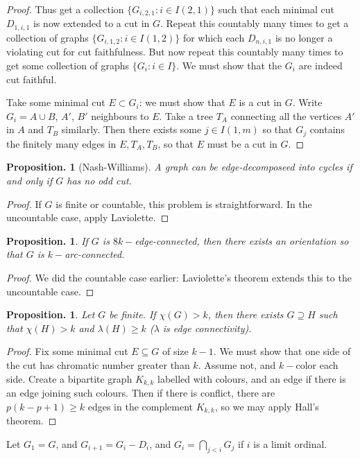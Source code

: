 \documentclass[11pt, a4paper]{memoir}
\theoremstyle{change}
\newtheorem{proposition}[theorem]{Proposition.}
\theoremstyle{plain}
\theoremstyle{nonumberplain}
\newtheorem{proof}{Proof}
\numberwithin{equation}{section}
\begin{document}
\begin{proof}
    Thus get a collection $\{G_{i,2,1}:i\in I(2,1)\}$ such that each minimal cut $D_{1,i,1}$ is now extended to a cut in $G$.
    Repeat this countably many times to get a collection of graphs $\{G_{i,1,2}:i\in I(1,2)\}$ for which each $D_{n,i,1}$ is no longer a violating cut for cut faithfulness.
    But now repeat this countably many times to get some collection of graphs $\{G_i:i\in I\}$.
    We must show that the $G_i$ are indeed cut faithful.

    Take some minimal cut $E\subset G_i$: we must show that $E$ is a cut in $G$.
    Write $G_i=A\cup B$, $A'$, $B'$ neighbours to $E$.
    Take a tree $T_A$ connecting all the vertices $A'$ in $A$ and $T_B$ similarly.
    Then there exists some $j\in I(1,m)$ so that $G_j$ contains the finitely many edges in $E,T_A,T_B$, so that $E$ must be a cut in $G$.
\end{proof}
\begin{proposition}[Nash-Williams]
    A graph can be edge-decomposeed into cycles if and only if $G$ has no odd cut.
\end{proposition}
\begin{proof}
    If $G$ is finite or countable, this problem is straightforward.
    In the uncountable case, apply Laviolette.
\end{proof}
\begin{proposition}
    If $G$ is $8k-$edge-connected, then there exists an orientation so that $G$ is $k-$arc-connected.
\end{proposition}
\begin{proof}
    We did the countable case earlier: Laviolette's theorem extends this to the uncountable case.
\end{proof}
\begin{proposition}
    Let $G$ be finite.
    If $\chi(G)>k$, then there exists $G\supseteq H$ such that $\chi(H)>k$ and $\lambda(H)\geq k$ ($\lambda$ is edge connectivity).
\end{proposition}
\begin{proof}
    Fix some minimal cut $E\subseteq G$ of size $k-1$.
    We must show that one side of the cut has chromatic number greater than $k$.
    Assume not, and $k-$color each side.
    Create a bipartite graph $K_{k,k}$ labelled with colours, and an edge if there is an edge joining such colours.
    Then if there is conflict, there are $p(k-p+1)\geq k$ edges in the complement $K_{k,k}$, so we may apply Hall's theorem.
\end{proof}
Let $G_1=G$, and $G_{i+1}=G_i-D_i$, and $G_i=\bigcap_{j<i}G_j$ if $i$ is a limit ordinal.
\end{document}
